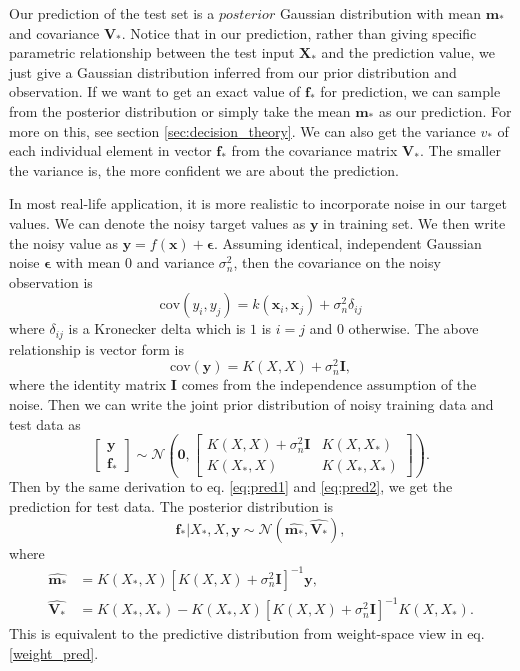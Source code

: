 \documentclass[11pt,a4paper]{article}
\theoremstyle{definition}
\numberwithin{equation}{section}
\let\vec\mathbf
\begin{document}
	Our prediction of the test set is a $posterior$ Gaussian distribution with mean $\vec m_*$ and covariance $\vec V_*$.  Notice that in our prediction, rather than giving specific parametric relationship between the test input $\vec X_*$ and the prediction value, we just give a Gaussian distribution inferred from our prior distribution and observation. If we want to get an exact value of $\vec f_*$ for prediction, we can sample from the posterior distribution or simply take the mean $\vec m_*$ as our prediction. For more on this, see section \ref{sec:decision_theory}. We can also get the variance $v_*$ of each individual element in vector  $\vec f_*$ from the covariance matrix $\vec V_*$. The smaller the variance is, the more confident we are about the prediction. 
	
	In most real-life application, it is more realistic to incorporate noise in our target values. We can denote the noisy target values as $\vec y$ in training set. We then write the noisy value as $\vec y = f(\vec x) + \vec\epsilon$. Assuming identical, independent Gaussian noise $\vec \epsilon$ with mean $0$ and variance $\sigma^2_n$, then the covariance on the noisy observation is
	\begin{equation*} \label{}
	\mathrm{cov} (y_i,y_j) = k(\vec x_i,\vec x_j) + \sigma^2_n \delta_{ij}
	\end{equation*}
	where $\delta_{ij}$ is a Kronecker delta which is $1$ is $i=j$ and $0$ otherwise. The above relationship is vector form is
	\begin{equation} \label{cov_y}
	\mathrm{cov} (\vec y) = K(X,X) + \sigma^2_n \vec I,
	\end{equation}
	where the identity matrix $\vec I$ comes from the independence assumption of the noise. Then we can write the joint prior distribution of noisy training data and test data as
	\begin{equation} \label{}
	\begin{bmatrix}
	\vec y\\
	\vec f_*
	\end{bmatrix}
	\sim
	\mathcal{N}\left(\vec 0, 
	\begin{bmatrix}
	K(X,X)+ \sigma^2_n \vec I & K(X,X_*)\\
	K(X_*,X) & K(X_*,X_*)
	\end{bmatrix}
	\right).
	\end{equation}
	Then by the same derivation to eq. \ref{eq:pred1} and \ref{eq:pred2}, we get the prediction for test data. The posterior distribution is 
	\begin{equation} \label{eq:pred3}
	\vec f_* | X_*, X, \vec y \sim \mathcal N (\widehat{\vec m_*}, \widehat{\vec V_*}),
	\end{equation}
	where
	\begin{equation} \label{eq:pred4}
	\begin{split}
	\widehat{\vec m_* }&= K(X_*,X)[K(X,X)+ \sigma^2_n \vec I]^{-1}\vec y,\\
	\widehat{\vec V_*} &= K(X_*,X_*) - K(X_*,X)[K(X,X)+ \sigma^2_n \vec I]^{-1}K(X,X_*).
	\end{split}
	\end{equation}
This is equivalent to the predictive distribution from weight-space view in eq.\ref{weight_pred}.
	
\end{document}
